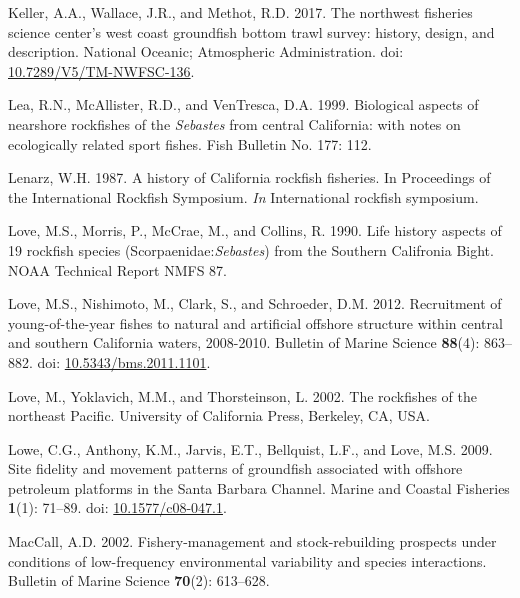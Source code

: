 \documentclass[11pt,
  english,
  a4paper,
]{article}
\newlength{\cslhangindent}
\newenvironment{CSLReferences}[2] %
 {%
  \setlength{\parindent}{0pt}
  \ifodd #1 \everypar{\setlength{\hangindent}{\cslhangindent}}\ignorespaces\fi
  \ifnum #2 > 0
  \setlength{\parskip}{#2\baselineskip}
  \fi
 }%
 {}
\begin{document}
\begin{CSLReferences}{1}{0}
\leavevmode{}%
Keller, A.A., Wallace, J.R., and Methot, R.D. 2017. {The northwest fisheries science center's west coast groundfish bottom trawl survey: history, design, and description}. National Oceanic; Atmospheric Administration. doi: \href{https://doi.org/10.7289/V5/TM-NWFSC-136}{10.7289/V5/TM-NWFSC-136}.

\leavevmode{}%
Lea, R.N., McAllister, R.D., and VenTresca, D.A. 1999. {Biological aspects of nearshore rockfishes of the \emph{Sebastes} from central California: with notes on ecologically related sport fishes.} Fish Bulletin No. 177: 112.

\leavevmode{}%
Lenarz, W.H. 1987. {A history of California rockfish fisheries. In Proceedings of the International Rockfish Symposium.} \emph{In} International rockfish symposium.

\leavevmode{}%
Love, M.S., Morris, P., McCrae, M., and Collins, R. 1990. {Life history aspects of 19 rockfish species (Scorpaenidae:\emph{Sebastes}) from the Southern Califronia Bight}. NOAA Technical Report NMFS 87.

\leavevmode{}%
Love, M.S., Nishimoto, M., Clark, S., and Schroeder, D.M. 2012. {Recruitment of young-of-the-year fishes to natural and artificial offshore structure within central and southern California waters, 2008-2010}. Bulletin of Marine Science \textbf{88}(4): 863--882. doi: \href{https://doi.org/10.5343/bms.2011.1101}{10.5343/bms.2011.1101}.

\leavevmode{}%
Love, M., Yoklavich, M.M., and Thorsteinson, L. 2002. {The rockfishes of the northeast Pacific}. University of California Press, Berkeley, CA, USA.

\leavevmode{}%
Lowe, C.G., Anthony, K.M., Jarvis, E.T., Bellquist, L.F., and Love, M.S. 2009. {Site fidelity and movement patterns of groundfish associated with offshore petroleum platforms in the Santa Barbara Channel}. Marine and Coastal Fisheries \textbf{1}(1): 71--89. doi: \href{https://doi.org/10.1577/c08-047.1}{10.1577/c08-047.1}.

\leavevmode{}%
MacCall, A.D. 2002. {Fishery-management and stock-rebuilding prospects under conditions of low-frequency environmental variability and species interactions}. Bulletin of Marine Science \textbf{70}(2): 613--628.


\end{CSLReferences}
\end{document}
